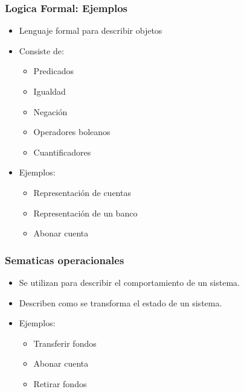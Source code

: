\documentclass{beamer}
\begin{document}
\begin{frame}
    \frametitle{Logica Formal: Ejemplos}
    \begin{itemize}
        \item{Lenguaje formal para describir objetos}
        \item{Consiste de:
            \begin{itemize}
                \item{Predicados}
                \item{Igualdad}
                \item{Negaci\'on}
                \item{Operadores boleanos}
                \item{Cuantificadores}
            \end{itemize}
        }
        \item{Ejemplos:
            \begin{itemize}
                \item{Representaci\'on de cuentas}
                \item{Representaci\'on de un banco}
                \item{Abonar cuenta}
            \end{itemize}
        }
        
    \end{itemize}

\end{frame}

\begin{frame}
    \frametitle{Sematicas operacionales}
    \begin{itemize}
        \item{Se utilizan para describir el comportamiento de un sistema.}
        \item{Describen como se transforma el estado de un sistema.}
        \item{Ejemplos:
            \begin{itemize}
                \item{Transferir fondos}
                \item{Abonar cuenta}
                \item{Retirar fondos}
            \end{itemize}
        }
    \end{itemize}
\end{frame}
\end{document}
